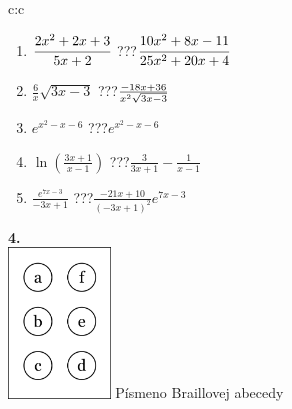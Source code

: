 \documentclass[10pt]{report}
\begin{document}
\begin{tabular}{c:c}
\begin{minipage}[c][104.5mm][t]{0.5\linewidth}
\begin{center}
\begin{minipage}{0.79\linewidth}
\begin{center}
\begin{varwidth}{\linewidth}
\begin{enumerate}
\item $\cfrac{2x^2+2x+3}{5x+2}$\quad \dotfill\; ???\;\dotfill \quad $\cfrac{10x^2+8x-11}{25x^2+20x+4}$
\item $\frac{6}{x}\sqrt{3x-3}$\quad \dotfill\; ???\;\dotfill \quad $\frac{-18x+36}{x^2 \sqrt{\smash[b]{3x-3}}}$
\item $e^{x^2-x-6}$\quad \dotfill\; ???\;\dotfill \quad $e^{x^2-x-6}$
\item $\ln{\left(\frac{3x+1}{x-1}\right)}$\quad \dotfill\; ???\;\dotfill \quad $\frac{3}{3x+1}-\frac{1}{x-1}$
\item $\frac{e^{7x-3}}{-3x+1}$\quad \dotfill\; ???\;\dotfill \quad $\frac{-21x+10}{(-3x+1)^2}e^{7x-3}$
\end{enumerate}
\end{varwidth}
\end{center}
\end{minipage}
\begin{minipage}{0.20\linewidth}
\begin{center}
{\Huge\bfseries 4.} \\[2mm]
\includegraphics[height=40mm]{../images/braille.png}
{\small Písmeno Braillovej abecedy}
\end{center}
\end{minipage}
\end{center}
\end{minipage}
%
\end{tabular}
\newpage
\thispagestyle{empty}
\end{document}
